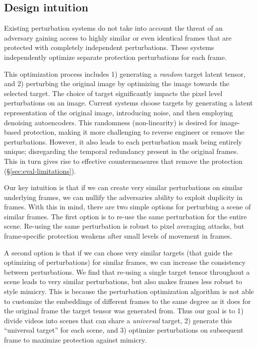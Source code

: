 \subsection{Design intuition} 

 Existing perturbation
systems do not take into account the threat of an adversary gaining access to
highly similar or even identical frames that are protected with completely
independent perturbations.  These systems independently optimize separate
protection perturbations for each frame.

This optimization process includes 1) generating a \textit{random} target latent
tensor, and 2) perturbing the original image by optimizing the 
image towards the selected target.  The choice of target significantly
impacts the pixel level perturbations on an image. Current systems choose
targets by generating a latent representation of the original image,
introducing noise, and then employing denoising autoencoders.  This
randomness (\ie non-linearity) is desired for image-based protection, making
it more challenging to reverse engineer or remove the perturbations. However,
it also leads to each perturbation mask being entirely unique; disregarding
the temporal redundancy present in the original frames. This in turn gives
rise to effective countermeasures that remove the protection
(\S\ref{sec:eval-limitations}).

Our key intuition is that if we can create very similar perturbations on
similar underlying frames, we can nullify the adversaries ability to exploit
duplicity in frames. With this in mind, there are two simple options for
perturbing a scene of similar frames. The first option is to re-use the same
perturbation for the entire scene. Re-using the same perturbation is robust
to pixel averaging attacks, but frame-specific protection weakens after
small levels of movement in frames.

A second option is that if we can chose very similar targets (that guide the
optimizing of perturbations) for similar frames, we can increase the
consistency between perturbations. We find that re-using a single target
tensor throughout a scene leads to very similar perturbations, but also makes
frames less robust to style mimicry. This is because the perturbation
optimization algorithm is not able to customize the embeddings of different
frames to the same degree as it does for the original frame the
target tensor was generated from. Thus our goal is to 1) divide 
videos into scenes that can share a \textit{universal} target, 2) generate
this ``universal target'' for each scene, and 3) optimize perturbations on
subsequent frame to maximize protection against mimicry.

